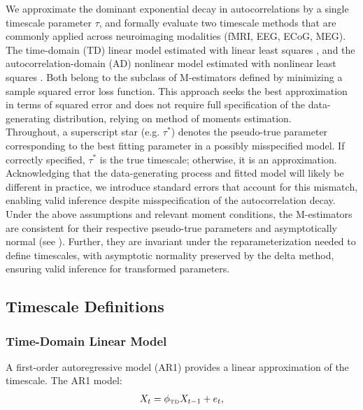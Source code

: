\documentclass[docs/main.tex]{subfiles}
\begin{document}
We approximate the dominant exponential decay in autocorrelations by a single timescale parameter $\tau$, and formally evaluate two timescale methods that are commonly applied across neuroimaging modalities (fMRI, EEG, ECoG, MEG). The time-domain (TD) linear model estimated with linear least squares \citep{kaneoke_variance_2012, meisel_decline_2017, huang_timescales_2018, lurie_cortical_2024, shinn_functional_2023, shafiei_topographic_2020, spitmaan_multiple_2020, trepka_training-dependent_2024}, and the autocorrelation-domain (AD) nonlinear model estimated with nonlinear least squares \citep{rossi-pool_invariant_2021, cirillo_neural_2018, ito_cortical_2020, runyan_distinct_2017, zeraati_flexible_2022, nougaret_intrinsic_2021, wasmuht_intrinsic_2018, muller_core_2020, maisson_choice-relevant_2021, li_hierarchical_2022, shafiei_topographic_2020}. Both belong to the subclass of M-estimators defined by minimizing a sample squared error loss function. This approach seeks the best approximation in terms of squared error and does not require full specification of the data-generating distribution, relying on method of moments estimation. \\

Throughout, a superscript star (e.g. $\tau^*$) denotes the pseudo-true parameter corresponding to the best fitting parameter in a possibly misspecified model. If correctly specified, $\tau^*$ is the true timescale; otherwise, it is an approximation. Acknowledging that the data-generating process and fitted model will likely be different in practice, we introduce standard errors that account for this mismatch, enabling valid inference despite misspecification of the autocorrelation decay. Under the above assumptions and relevant moment conditions, the M-estimators are consistent for their respective pseudo-true parameters and asymptotically normal (see ). Further, they are invariant under the reparameterization needed to define timescales, with asymptotic normality preserved by the delta method, ensuring valid inference for transformed parameters.

\subsection{Timescale Definitions}

\subsubsection{Time-Domain Linear Model}\label{sec:time-domain-linear-model}
A first-order autoregressive model (AR1) provides a linear approximation of the timescale. The AR1 model:
\begin{align}\label{eq:ar1}
    X_t = \phi_{\scriptscriptstyle\text{TD}} X_{t-1} + e_t,
\end{align}
\end{document}
